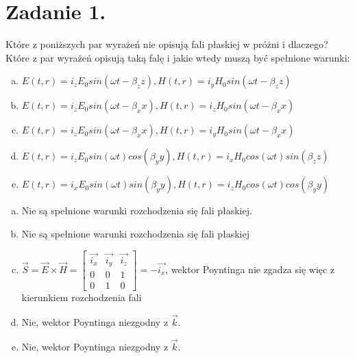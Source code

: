 \section*{Zadanie 1.}

\begin{task}
Które z poniższych par wyrażeń nie opisują fali płaskiej w próżni i dlaczego? Które z par wyrażeń opisują taką falę i jakie wtedy muszą być spełnione warunki:
\begin{enumerate}[a)]
\item $ E(t, r) = {i}_{z}{E}_{0}sin(\omega t - {\beta}_{z}z), H(t, r) = {i}_{y}{H}_{0}sin(\omega t - {\beta}_{z}z) $
\item $ E(t, r) = {i}_{z}{E}_{0}sin(\omega t - {\beta}_{x}x), H(t, r) = {i}_{z}{H}_{0}sin(\omega t - {\beta}_{x}x) $
\item $ E(t, r) = {i}_{z}{E}_{0}sin(\omega t - {\beta}_{x}x), H(t, r) = {i}_{y}{H}_{0}sin(\omega t - {\beta}_{x}x) $
\item $ E(t, r) = {i}_{z}{E}_{0}sin(\omega t)cos({\beta}_{y}y), H(t, r) = {i}_{x}{H}_{0}cos(\omega t)sin({\beta}_{z}z) $
\item $ E(t, r) = {i}_{x}{E}_{0}sin(\omega t)sin({\beta}_{y}y), H(t, r) = {i}_{z}{H}_{0}cos(\omega t)cos({\beta}_{y}y) $\\
\end{enumerate}
\end{task}

\begin{solution}
\begin{enumerate}[a)]
\item Nie są spełnione warunki rozchodzenia się fali płaskiej.
\item Nie są spełnione warunki rozchodzenia się fali płaskiej
\item $ \vec{S} = \vec{E}\times\vec{H} = \left[ \begin{matrix} \vec{{i}_{x}} & \vec{{i}_{y}}  & \vec{{i}_{z}}  \\ 0 & 0 & 1 \\ 0 & 1 & 0 \end{matrix} \right] = -\vec{{i}_{x}} $, wektor Poyntinga nie zgadza się więc z kierunkiem rozchodzenia fali
\item Nie, wektor Poyntinga niezgodny z $\vec{k}$.
\item Nie, wektor Poyntinga niezgodny z $\vec{k}$.
\end{enumerate}
\end{solution}